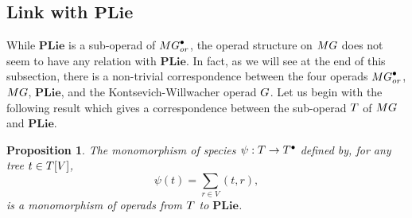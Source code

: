 \documentclass[11pt]{article}
\newtheorem{prop}[theo]{Proposition}
\theoremstyle{definition}
\numberwithin{equation}{section}
\newcommand{\spe}[1]{\normalfont{\textsc{#1}}}
\newcommand{\op}[1]{\mathbf{#1}}
\newcommand{\point}[1]{#1^{\bullet}}
\newcommand{\T}{\spe{T}}
\newcommand{\G}{\spe{G}}
\newcommand{\MG}{\spe{MG}}
\newcommand{\PLie}{\op{PLie}}
\begin{document}
\subsection{Link with \texorpdfstring{$\PLie$}{PLie}}
While $\PLie$ is a sub-operad of $\point{\MG}_{or}$, the operad structure on $\MG$ does not seem to have any 
relation with $\PLie$. In fact, as we will see at the end of this subsection, there is a non-trivial 
correspondence between the four operads $\point{\MG}_{or}$, $\MG$, $\PLie$, and the Kontsevich-Willwacher 
operad $\G$. Let us begin with the following result which gives a correspondence between the sub-operad $\T$ 
of $\MG$ and $\PLie$.

\begin{prop} \label{prop_prelie}
    The monomorphism of species $\psi : \T \to \point{\T}$ defined by, for any tree $t \in \T[V]$,
    \begin{equation}
        \psi(t) =  \sum_{r \in V} (t, r),
    \end{equation}
    is a monomorphism of operads from $\T$ to $\PLie$.
\end{prop}
\end{document}
